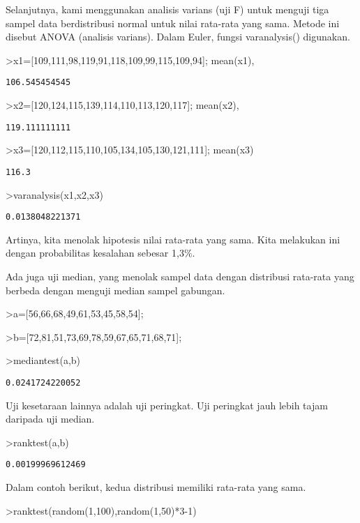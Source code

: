 \documentclass[
]{book}
\begin{document}
Selanjutnya, kami menggunakan analisis varians (uji F) untuk menguji tiga sampel data berdistribusi normal untuk nilai rata-rata yang sama. Metode ini disebut ANOVA (analisis varians). Dalam Euler, fungsi varanalysis() digunakan.

\textgreater x1={[}109,111,98,119,91,118,109,99,115,109,94{]}; mean(x1),

\begin{verbatim}
106.545454545
\end{verbatim}

\textgreater x2={[}120,124,115,139,114,110,113,120,117{]}; mean(x2),

\begin{verbatim}
119.111111111
\end{verbatim}

\textgreater x3={[}120,112,115,110,105,134,105,130,121,111{]}; mean(x3)

\begin{verbatim}
116.3
\end{verbatim}

\textgreater varanalysis(x1,x2,x3)

\begin{verbatim}
0.0138048221371
\end{verbatim}

Artinya, kita menolak hipotesis nilai rata-rata yang sama. Kita melakukan ini dengan probabilitas kesalahan sebesar 1,3\%.

Ada juga uji median, yang menolak sampel data dengan distribusi rata-rata yang berbeda dengan menguji median sampel gabungan.

\textgreater a={[}56,66,68,49,61,53,45,58,54{]};

\textgreater b={[}72,81,51,73,69,78,59,67,65,71,68,71{]};

\textgreater mediantest(a,b)

\begin{verbatim}
0.0241724220052
\end{verbatim}

Uji kesetaraan lainnya adalah uji peringkat. Uji peringkat jauh lebih tajam daripada uji median.

\textgreater ranktest(a,b)

\begin{verbatim}
0.00199969612469
\end{verbatim}

Dalam contoh berikut, kedua distribusi memiliki rata-rata yang sama.

\textgreater ranktest(random(1,100),random(1,50)*3-1)
\end{document}
